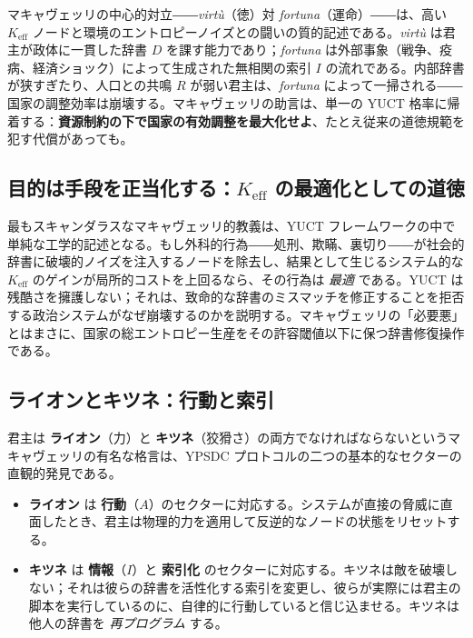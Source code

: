 \documentclass[12pt,a4paper]{article}
\begin{document}
	マキャヴェッリの中心的対立――\emph{virtù}（徳）対 \emph{fortuna}（運命）――は、高い \(K_{\mathrm{eff}}\) ノードと環境のエントロピーノイズとの闘いの質的記述である。\emph{virtù} は君主が政体に一貫した辞書 \(D\) を課す能力であり；\emph{fortuna} は外部事象（戦争、疫病、経済ショック）によって生成された無相関の索引 \(I\) の流れである。内部辞書が狭すぎたり、人口との共鳴 \(R\) が弱い君主は、\emph{fortuna} によって一掃される――国家の調整効率は崩壊する。マキャヴェッリの助言は、単一の YUCT 格率に帰着する：\textbf{資源制約の下で国家の有効調整を最大化せよ}、たとえ従来の道徳規範を犯す代償があっても。
	
	\subsection{目的は手段を正当化する：\(K_{\mathrm{eff}}\) の最適化としての道徳}
	
	最もスキャンダラスなマキャヴェッリ的教義は、YUCT フレームワークの中で単純な工学的記述となる。もし外科的行為――処刑、欺瞞、裏切り――が社会的辞書に破壊的ノイズを注入するノードを除去し、結果として生じるシステム的な \(K_{\mathrm{eff}}\) のゲインが局所的コストを上回るなら、その行為は \emph{最適} である。YUCT は残酷さを擁護しない；それは、致命的な辞書のミスマッチを修正することを拒否する政治システムがなぜ崩壊するのかを説明する。マキャヴェッリの「必要悪」とはまさに、国家の総エントロピー生産をその許容閾値以下に保つ辞書修復操作である。
	
	\subsection{ライオンとキツネ：行動と索引}
	
	君主は \textbf{ライオン}（力）と \textbf{キツネ}（狡猾さ）の両方でなければならないというマキャヴェッリの有名な格言は、YPSDC プロトコルの二つの基本的なセクターの直観的発見である。
	
	\begin{itemize}[leftmargin=*]
		\item \textbf{ライオン} は \textbf{行動}（\(A\)）のセクターに対応する。システムが直接の脅威に直面したとき、君主は物理的力を適用して反逆的なノードの状態をリセットする。
		\item \textbf{キツネ} は \textbf{情報}（\(I\)）と \textbf{索引化} のセクターに対応する。キツネは敵を破壊しない；それは彼らの辞書を活性化する索引を変更し、彼らが実際には君主の脚本を実行しているのに、自律的に行動していると信じ込ませる。キツネは他人の辞書を \emph{再プログラム} する。
	\end{itemize}
	
\end{document}
